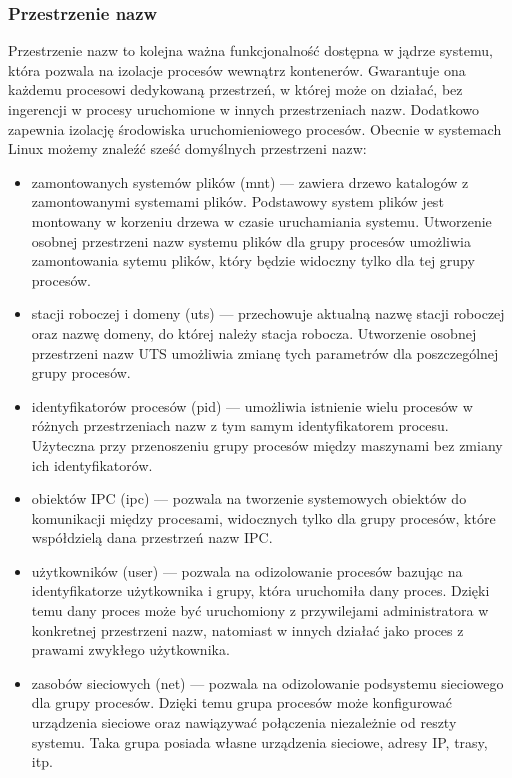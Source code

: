 \documentclass[12pt]{report}
\let\Oldsubsubsection\subsubsection
\renewcommand{\subsubsection}{\FloatBarrier\Oldsubsubsection}
\begin{document}
\subsubsection{Przestrzenie nazw}
Przestrzenie nazw to kolejna ważna funkcjonalność dostępna w jądrze systemu, która pozwala na izolacje procesów wewnątrz kontenerów. Gwarantuje ona każdemu procesowi dedykowaną przestrzeń, w której może on działać, bez ingerencji w procesy uruchomione w innych przestrzeniach nazw. Dodatkowo zapewnia izolację środowiska uruchomieniowego procesów. Obecnie w systemach Linux możemy znaleźć sześć domyślnych przestrzeni nazw:
\begin{itemize}
\item zamontowanych systemów plików (mnt) --- zawiera drzewo katalogów z zamontowanymi systemami plików. Podstawowy system plików jest montowany w korzeniu drzewa w czasie uruchamiania systemu. Utworzenie osobnej przestrzeni nazw systemu plików dla grupy procesów umożliwia zamontowania sytemu plików, który będzie widoczny tylko dla tej grupy procesów. 

\item stacji roboczej i domeny (uts) --- przechowuje aktualną nazwę stacji roboczej oraz nazwę domeny, do której należy stacja robocza. Utworzenie osobnej przestrzeni nazw UTS umożliwia zmianę tych parametrów dla poszczególnej grupy procesów.

\item identyfikatorów procesów (pid) --- umożliwia istnienie wielu procesów w różnych przestrzeniach nazw z tym samym identyfikatorem procesu. Użyteczna przy przenoszeniu grupy procesów między maszynami bez zmiany ich identyfikatorów.

\item obiektów IPC (ipc) --- pozwala na tworzenie systemowych obiektów do komunikacji między procesami, widocznych tylko dla grupy procesów, które współdzielą dana przestrzeń nazw IPC.

\item użytkowników (user) --- pozwala na odizolowanie procesów bazując na identyfikatorze użytkownika i grupy, która uruchomiła dany proces. Dzięki temu dany proces może być uruchomiony z przywilejami administratora w konkretnej przestrzeni nazw, natomiast w innych działać jako proces z prawami zwykłego użytkownika.

\item zasobów sieciowych (net) --- pozwala na odizolowanie podsystemu sieciowego dla grupy procesów. Dzięki temu grupa procesów może konfigurować urządzenia sieciowe oraz nawiązywać połączenia niezależnie od reszty systemu. Taka grupa posiada własne urządzenia sieciowe, adresy IP, trasy, itp.
\end{itemize}
\end{document}
